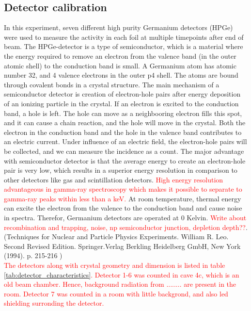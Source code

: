 \subsection{Detector calibration}
In this experiment, seven different high purity Germanium detectors (HPGe) were used to measure the activity in each foil at multiple timepoints after end of beam. The HPGe-detector is a type of semiconductor, which is a material where the energy required to remove an electron from the valence band (in the outer atomic shell) to the conduction band is small. A Germanium atom has atomic number 32, and 4 valence electrons in the outer p4 shell. The atoms are bound through covalent bonds in a crystal structure. The main mechanism of a semiconductor detector is creation of electron-hole pairs after energy deposition of an ionizing particle in the crystal. If an electron is excited to the conduction band, a hole is left. The hole can move as a neighbooring electron fills this spot, and it can cause a chain reaction, and the hole will move in the crystal. Both the electron in the conduction band and the hole in  the valence band contributes to an electric current. Under influence of an electric field, the electron-hole pairs will be collected, and we can measure the incidence as a count. The major advantage with semiconductor detector is that the average energy to create an electron-hole pair is very low, which results in a superior energy resolution in comparison to other detectors like gas and scintillation detectors. \textcolor{red}{High energy resolution advantageous in gamma-ray spectroscopy which makes it possible to separate to gamma-ray peaks within less than a keV.} At room temperature,  thermal energy can excite the electron from the valence to the conduction band and cause noise in spectra. Therefor, Germanium detectors are operated at 0 Kelvin. \textcolor{red}{Write about recombination and trapping, noise, np semiconductor junction, depletion depth??}. (Techniques for Nuclear and Particle Physics Experiments. William R. Leo. Second Revised Edition. Springer.Verlag Berkling Heidelberg GmbH, New York (1994). p. 215-216 )\\


\noindent
\textcolor{red}{
The detectors along with crystal geometry and dimension is listed in table \ref{tab:detector_characteristics}. Detector 1-6 was counted in cave 4c, which is an old beam chamber. Hence, background radiation from ........ are present in the room. Detector 7 was counted in a room with little backgrond, and also led shielding surronding the detector. }


